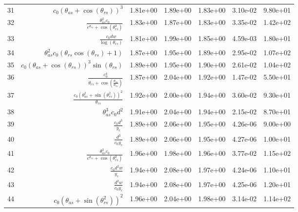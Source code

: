\begin{tabularx}{\textwidth}{lRRRRRl}
31  &  $ c_{0} \left(\theta_{as} + \cos{\left(\theta_{rs} \right)}\right)^{3} $  &  1.81e+00  &  1.89e+00  &  1.83e+00  &  3.10e-02  &  9.80e+01  \\ 
32  &  $ \displaystyle\frac{\theta_{as}^{2} c_{0}}{e^{\theta_{rs}} + \cos{\left(\theta_{rs}^{3} \right)}} $  &  1.83e+00  &  1.87e+00  &  1.83e+00  &  3.35e-02  &  1.42e+02  \\ 
33  &  $ \displaystyle\frac{c_{0} d w}{\log{\left(\theta_{rs} \right)}} $  &  1.81e+00  &  1.99e+00  &  1.85e+00  &  4.59e-03  &  1.80e+01  \\ 
34  &  $ \theta_{as}^{2} c_{0} \left(\theta_{rs} \cos{\left(\theta_{rs} \right)} + 1\right) $  &  1.87e+00  &  1.95e+00  &  1.89e+00  &  2.95e-02  &  1.07e+02  \\ 
35  &  $ c_{0} \left(\theta_{as} + \cos{\left(\theta_{rs} \right)}\right)^{3} \sin{\left(\theta_{rs} \right)} $  &  1.89e+00  &  1.95e+00  &  1.90e+00  &  2.61e-02  &  1.04e+02  \\ 
36  &  $ \displaystyle\frac{c_{0}^{4}}{\theta_{rs} + \cos{\left(\displaystyle\frac{\theta_{as}}{\theta_{rs}} \right)}} $  &  1.87e+00  &  2.04e+00  &  1.92e+00  &  1.47e-02  &  5.50e+01  \\ 
37  &  $ \displaystyle\frac{c_{0} \left(\theta_{as}^{2} + \sin{\left(\theta_{rs}^{2} \right)}\right)^{2}}{\theta_{rs}} $  &  1.92e+00  &  2.00e+00  &  1.94e+00  &  3.60e-02  &  9.30e+01  \\ 
38  &  $ \theta_{as}^{3} c_{0} d^{2} $  &  1.91e+00  &  2.04e+00  &  1.94e+00  &  2.15e-02  &  8.70e+01  \\ 
39  &  $ \displaystyle\frac{c_{0} d^{3}}{y_c} $  &  1.89e+00  &  2.06e+00  &  1.95e+00  &  4.26e-06  &  9.00e+00  \\ 
40  &  $ \displaystyle\frac{d^{3}}{c_{0} y_c} $  &  1.89e+00  &  2.06e+00  &  1.95e+00  &  4.27e-06  &  1.00e+01  \\ 
41  &  $ \displaystyle\frac{\theta_{as}^{3} c_{0}}{e^{\theta_{rs}} + \cos{\left(\theta_{rs}^{3} \right)}} $  &  1.96e+00  &  1.98e+00  &  1.96e+00  &  3.77e-02  &  1.15e+02  \\ 
42  &  $ \displaystyle\frac{c_{0} d^{2} w}{y_c} $  &  1.94e+00  &  2.08e+00  &  1.97e+00  &  4.24e-06  &  1.10e+01  \\ 
43  &  $ \displaystyle\frac{d^{2} w}{c_{0} y_c} $  &  1.94e+00  &  2.08e+00  &  1.97e+00  &  4.25e-06  &  1.20e+01  \\ 
44  &  $ c_{0} \left(\theta_{as} + \sin{\left(\theta_{rs}^{2} \right)}\right)^{2} $  &  1.96e+00  &  2.04e+00  &  1.98e+00  &  3.14e-02  &  1.14e+02  \\ 

\end{tabularx}
